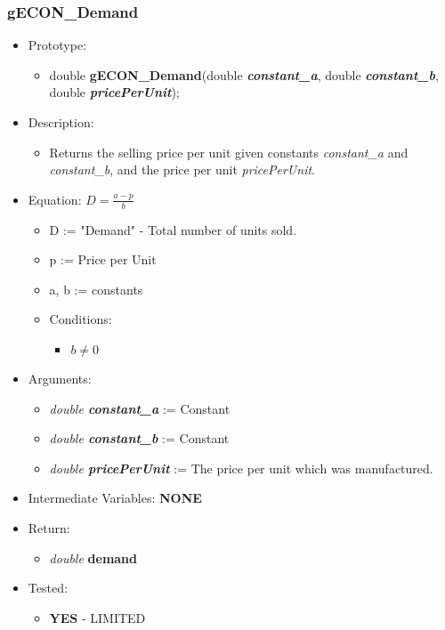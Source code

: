 \documentclass{article}
\begin{document}
{{{{{{%
\cleardoublepage
\subsubsection{gECON\_Demand}

\begin{itemize}
\item Prototype:
	\begin{itemize}
	\item double \textbf{gECON\_Demand}(double \textbf{\textit{constant\_a}}, double \textbf{\textit{constant\_b}}, double \textbf{\textit{pricePerUnit}});
	\end{itemize}
\item Description:
	\begin{itemize}
	\item Returns the selling price per unit given constants \textit{constant\_a} and \textit{constant\_b}, and the price per unit \textit{pricePerUnit}.
	\end{itemize}
\item Equation:     $D = \frac{a - p}{b}$
	\begin{itemize}
	\item D := "Demand" - Total number of units sold.
	\item p := Price per Unit
	\item a, b := constants
	\item Conditions:
		\begin{itemize}
		\item $b \ne 0$
		\end{itemize}
	\end{itemize}
\item Arguments:
	\begin{itemize}[noitemsep]
	\item \textit{double \textbf{constant\_a}} := Constant
	\item \textit{double \textbf{constant\_b}} := Constant
	\item \textit{double \textbf{pricePerUnit}} := The price per unit which was manufactured.
	\end{itemize} 
\item Intermediate Variables: \textbf{NONE}
\item Return:
	\begin{itemize}
	\item \textit{double} \textbf{demand}
	\end{itemize}
\item Tested:
	\begin{itemize}
	\item \textbf{YES} - LIMITED
	\end{itemize}
\end{itemize}

}}}}}}
\end{document}
